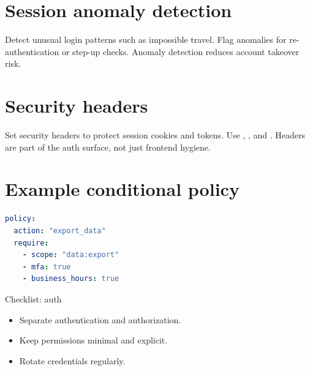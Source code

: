 \section{Session anomaly detection}
Detect unusual login patterns such as impossible travel.
Flag anomalies for re-authentication or step-up checks.
Anomaly detection reduces account takeover risk.

\section{Security headers}
Set security headers to protect session cookies and tokens.
Use , , and .
Headers are part of the auth surface, not just frontend hygiene.

\section{Example conditional policy}
\begin{lstlisting}[language=YAML]
policy:
  action: "export_data"
  require:
    - scope: "data:export"
    - mfa: true
    - business_hours: true
\end{lstlisting}

\begin{checklistbox}{Checklist: auth}
\begin{itemize}[nosep]
  \item Separate authentication and authorization.
  \item Keep permissions minimal and explicit.
  \item Rotate credentials regularly.
\end{itemize}
\end{checklistbox}
